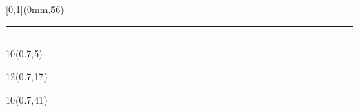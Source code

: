 \begin{frame}[plain]
	\begin{textblock*}{\paperwidth}[0,1](0mm,56\TPVertModule)
		\textcolor{rouge}{\rule{\banderougewidth}{\banderougeheight}}%
		\textcolor{bleu}{\rule{\bandeorwidth}{\bandeorheight}}
	\end{textblock*}
	
	\begin{textblock*}{10\TPHorizModule}(0.7\TPHorizModule,5\TPVertModule)
		\textcolor[rgb]{0.13,0.13,0.13}{\webinaire}
	\end{textblock*}
	
	\begin{textblock*}{12\TPHorizModule}(0.7\TPHorizModule,17\TPVertModule)
		\textcolor[rgb]{0.13,0.13,0.13}{\titlefmt}
	\end{textblock*}
	
	\begin{textblock*}{10\TPHorizModule}(0.7\TPHorizModule,41\TPVertModule)
		\textcolor[rgb]{0.13,0.13,0.13}{\datefmt}
	\end{textblock*}
\end{frame}
\endgroup
